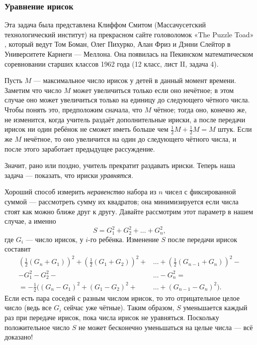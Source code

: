 \subsubsection*{Уравнение ирисок}

Эта задача была представлена Клиффом Смитом (Массачусетский технологический институт) на прекрасном сайте головоломок «The Puzzle Toad» \cite{bohman-pikhurko-frieze-sleator}, который ведут Том Боман, Олег Пихурко, Алан Фриз и Дэнни Слейтор в Университете Карнеги — Меллона.
Она появилась на Пекинском математическом соревновании старших классов 1962 года (12 класс, лист II, задача 4).

Пусть $M$ --- максимальное число ирисок у детей в данный момент времени.
Заметим что число $M$ может увеличиться только если оно нечётное;
в этом случае оно может увеличиться только на единицу до следующего чётного числа.
Чтобы понять это, предположим сначала, что $M$ чётное; тогда оно, конечно же, не изменится, когда учитель раздаёт дополнительные ириски, а после передачи ирисок ни один ребёнок не сможет иметь больше чем $\tfrac12 M + \tfrac12 M = M$ штук.
Если же $M$ нечётное, то оно увеличится на один до следующего чётного числа, и после этого заработает предыдущее рассуждение.

Значит, рано или поздно, учитель прекратит раздавать ириски.
Теперь наша задача --- показать, что ириски \emph{уравнятся}.

Хороший способ измерить \emph{неравенство} набора из $n$ чисел с фиксированной суммой --- рассмотреть сумму их квадратов; она минимизируется если числа стоят как можно ближе друг к другу.
Давайте рассмотрим этот параметр в нашем случае, а именно 
\[S = G^2_1 + G^2_2 + \dots + G^2_n,\]
где $G_i$ --- число ирисок, у $i$-го ребёнка.
Изменение $S$ после передачи ирисок составит
\begin{align*}
\left(\tfrac{1}{2}(G_n+G_1)\right)^2+\left(\tfrac{1}{2}(G_1+G_2)\right)^2+&\dots+\left(\tfrac{1}{2}(G_{n-1}+G_n)\right)^2-
\\
-G_1^2-G_2^2-&\dots-G_n^2=
\\
=-\tfrac12\bigl((G_n-G_1)^2+(G_1-G_2)^2+&\dots+(G_{n-1}-G_n)^2\bigr).
\end{align*}
Если есть пара соседей с разным числом ирисок, то это отрицательное целое число (ведь все $G_i$ сейчас уже чётные).
Таким образом, $S$ уменьшается каждый раз при передаче ирисок, пока числа ирисок не уравняться.
Поскольку положительное число $S$ не может бесконечно уменьшаться на целые числа --- всё доказано!

\medskip

